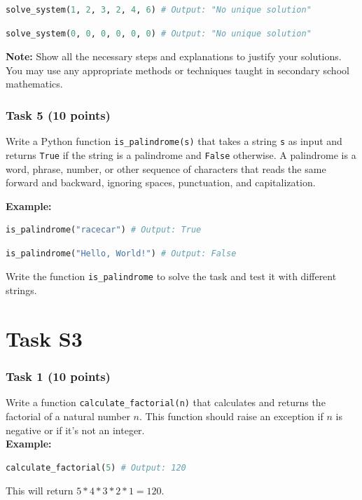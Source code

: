 \documentclass[12pt]{book}
\begin{document}
\begin{lstlisting}[language=Python]
solve_system(1, 2, 3, 2, 4, 6) # Output: "No unique solution"
\end{lstlisting}

\begin{lstlisting}[language=Python]
solve_system(0, 0, 0, 0, 0, 0) # Output: "No unique solution"
\end{lstlisting}

\textbf{Note:} Show all the necessary steps and explanations to justify your solutions. You may use any appropriate methods or techniques taught in secondary school mathematics.

\subsubsection{Task 5 (10 points)}
Write a Python function \texttt{is\_palindrome(s)} that takes a string \texttt{s} as input and returns \texttt{True} if the string is a palindrome and \texttt{False} otherwise. A palindrome is a word, phrase, number, or other sequence of characters that reads the same forward and backward, ignoring spaces, punctuation, and capitalization.

\textbf{Example:}
\begin{lstlisting}[language=Python]
is_palindrome("racecar") # Output: True
\end{lstlisting}


\begin{lstlisting}[language=Python]
is_palindrome("Hello, World!") # Output: False
\end{lstlisting}


Write the function \texttt{is\_palindrome} to solve the task and test it with different strings.



\newpage
\section{Task S3}

\subsubsection{Task 1 (10 points)}
Write a function \texttt{calculate\_factorial(n)} that calculates and returns the factorial of a natural number $n$. This function should raise an exception if $n$ is negative or if it's not an integer. \\
\textbf{Example:}
\begin{lstlisting}[language=Python]
calculate_factorial(5) # Output: 120
\end{lstlisting}
This will return $5*4*3*2*1 = 120$.
\end{document}
